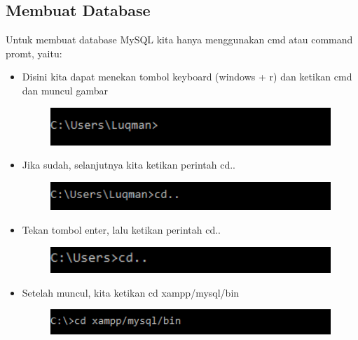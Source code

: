 \subsection{Membuat Database}
Untuk membuat database MySQL kita hanya menggunakan cmd atau command promt, yaitu:
\begin{itemize}
\item Disini kita dapat menekan tombol keyboard (windows + r) dan ketikan cmd dan muncul gambar

\begin{figure}[ht]
\centerline{\includegraphics[width=1\textwidth]
{figures/cmd}}
\caption{}
\label{cmd}
\end{figure}

\item Jika sudah, selanjutnya kita ketikan perintah cd..

\begin{figure}[ht]
\centerline{\includegraphics[width=1\textwidth]
{figures/cd1}}
\caption{}
\label{cd1}
\end{figure}

\item Tekan tombol enter, lalu ketikan perintah cd.. 

\begin{figure}[ht]
\centerline{\includegraphics[width=1\textwidth]
{figures/cd2}}
\caption{}
\label{cd2}
\end{figure}

\item Setelah muncul, kita ketikan cd xampp/mysql/bin

\begin{figure}[ht]
\centerline{\includegraphics[width=1\textwidth]
{figures/cd3}}
\caption{}
\label{cd3}
\end{figure}


\end{itemize}
